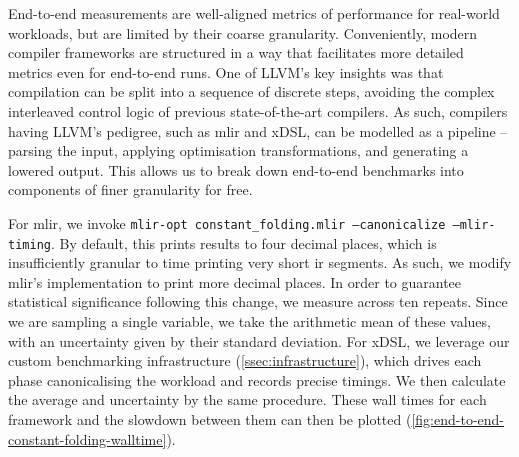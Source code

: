 End-to-end measurements are well-aligned metrics of performance for real-world workloads, but are limited by their coarse granularity. Conveniently, modern compiler frameworks are structured in a way that facilitates more detailed metrics even for end-to-end runs.
One of LLVM's key insights was that compilation can be split into a sequence of discrete steps, avoiding the complex interleaved control logic of previous state-of-the-art compilers.
As such, compilers having LLVM's pedigree, such as \ac{mlir} and xDSL, can be modelled as a pipeline -- parsing the input, applying optimisation transformations, and generating a lowered output.
This allows us to break down end-to-end benchmarks into components of finer granularity for free.

For \ac{mlir}, we invoke \texttt{mlir-opt constant_folding.mlir --canonicalize --mlir-timing}.
By default, this prints results to four decimal places, which is insufficiently granular to time printing very short \ac{ir} segments. As such, we modify \ac{mlir}'s implementation to print more decimal places. In order to guarantee statistical significance following this change, we measure across ten repeats. Since we are sampling a single variable, we take the arithmetic mean of these values, with an uncertainty given by their standard deviation.
For xDSL, we leverage our custom benchmarking infrastructure (\autoref{ssec:infrastructure}), which drives each phase canonicalising the workload and records precise timings. We then calculate the average and uncertainty by the same procedure.
These wall times for each framework and the slowdown between them can then be plotted (\autoref{fig:end-to-end-constant-folding-walltime}).

